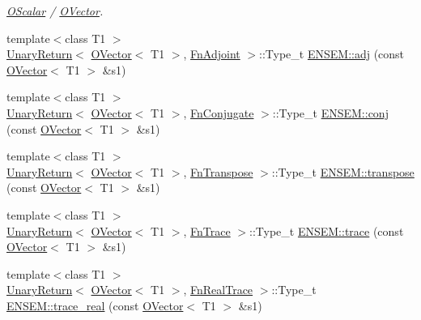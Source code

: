 \begin{DoxyCompactItemize}
\begin{DoxyCompactList}\small\item\em \mbox{\hyperlink{classENSEM_1_1OScalar}{O\+Scalar}} / \mbox{\hyperlink{classENSEM_1_1OVector}{O\+Vector}}. \end{DoxyCompactList}\item 
{\footnotesize template$<$class T1 $>$ }\\\mbox{\hyperlink{structENSEM_1_1UnaryReturn}{Unary\+Return}}$<$ \mbox{\hyperlink{classENSEM_1_1OVector}{O\+Vector}}$<$ T1 $>$, \mbox{\hyperlink{structENSEM_1_1FnAdjoint}{Fn\+Adjoint}} $>$\+::Type\+\_\+t \mbox{\hyperlink{group__obsvector_gab801d265f143d9dca7ac1e3298640bf7}{E\+N\+S\+E\+M\+::adj}} (const \mbox{\hyperlink{classENSEM_1_1OVector}{O\+Vector}}$<$ T1 $>$ \&s1)
\item 
{\footnotesize template$<$class T1 $>$ }\\\mbox{\hyperlink{structENSEM_1_1UnaryReturn}{Unary\+Return}}$<$ \mbox{\hyperlink{classENSEM_1_1OVector}{O\+Vector}}$<$ T1 $>$, \mbox{\hyperlink{structENSEM_1_1FnConjugate}{Fn\+Conjugate}} $>$\+::Type\+\_\+t \mbox{\hyperlink{group__obsvector_ga77a1805866a66a7f5215fb784b9c2725}{E\+N\+S\+E\+M\+::conj}} (const \mbox{\hyperlink{classENSEM_1_1OVector}{O\+Vector}}$<$ T1 $>$ \&s1)
\item 
{\footnotesize template$<$class T1 $>$ }\\\mbox{\hyperlink{structENSEM_1_1UnaryReturn}{Unary\+Return}}$<$ \mbox{\hyperlink{classENSEM_1_1OVector}{O\+Vector}}$<$ T1 $>$, \mbox{\hyperlink{structENSEM_1_1FnTranspose}{Fn\+Transpose}} $>$\+::Type\+\_\+t \mbox{\hyperlink{group__obsvector_ga9c3c97af68e1cfa2eb913c66fa87188b}{E\+N\+S\+E\+M\+::transpose}} (const \mbox{\hyperlink{classENSEM_1_1OVector}{O\+Vector}}$<$ T1 $>$ \&s1)
\item 
{\footnotesize template$<$class T1 $>$ }\\\mbox{\hyperlink{structENSEM_1_1UnaryReturn}{Unary\+Return}}$<$ \mbox{\hyperlink{classENSEM_1_1OVector}{O\+Vector}}$<$ T1 $>$, \mbox{\hyperlink{structENSEM_1_1FnTrace}{Fn\+Trace}} $>$\+::Type\+\_\+t \mbox{\hyperlink{group__obsvector_ga7b30f87898883f11b8b43b5b3df77bea}{E\+N\+S\+E\+M\+::trace}} (const \mbox{\hyperlink{classENSEM_1_1OVector}{O\+Vector}}$<$ T1 $>$ \&s1)
\item 
{\footnotesize template$<$class T1 $>$ }\\\mbox{\hyperlink{structENSEM_1_1UnaryReturn}{Unary\+Return}}$<$ \mbox{\hyperlink{classENSEM_1_1OVector}{O\+Vector}}$<$ T1 $>$, \mbox{\hyperlink{structENSEM_1_1FnRealTrace}{Fn\+Real\+Trace}} $>$\+::Type\+\_\+t \mbox{\hyperlink{group__obsvector_ga89062217a6c2e9173699e36b88ed9b05}{E\+N\+S\+E\+M\+::trace\+\_\+real}} (const \mbox{\hyperlink{classENSEM_1_1OVector}{O\+Vector}}$<$ T1 $>$ \&s1)

\end{DoxyCompactItemize}
